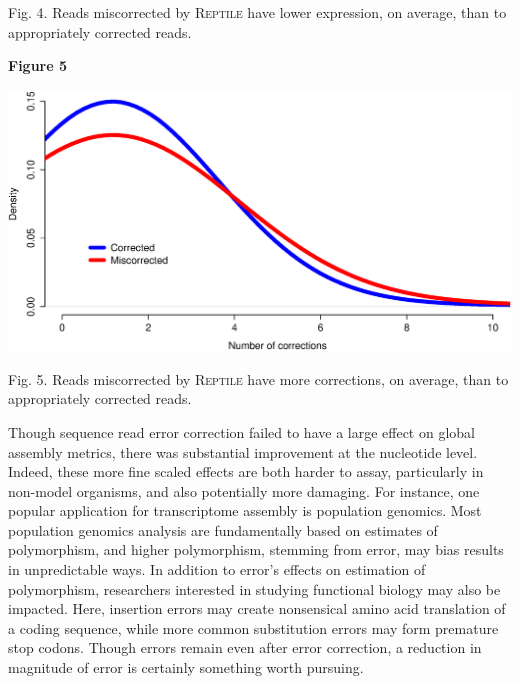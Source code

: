 \documentclass[11pt]{article}
\begin{document}
\noindent
\begin{changemargin}{2cm}{2cm}
Fig. 4. Reads miscorrected by \textsc{Reptile} have lower expression, on average, than to appropriately corrected reads.
\end{changemargin}
\vspace{10mm}



\textbf{\hypertarget{Figure 5}{Figure 5}} \\
\centerline{\includegraphics[width=20.0\baselineskip]{FigX.eps}}

\noindent
\begin{changemargin}{2cm}{2cm}
Fig. 5. Reads miscorrected by \textsc{Reptile} have more corrections, on average, than to appropriately corrected reads.
\end{changemargin}
\vspace{10mm}

\noindent
Though sequence read error correction failed to have a large effect on global assembly metrics, there was substantial improvement at the nucleotide level.  Indeed, these more fine scaled effects are both harder to assay, particularly in non-model organisms, and also potentially more damaging. For instance, one popular application for transcriptome assembly is population genomics.  Most population genomics analysis are fundamentally based on estimates of polymorphism, and higher polymorphism, stemming from error, may bias results in unpredictable ways. In addition to error's effects on estimation of polymorphism, researchers interested in studying functional biology may also be impacted. Here, insertion errors may create nonsensical amino acid translation of a coding sequence, while more common substitution errors may form premature stop codons.  Though errors remain even after error correction, a reduction in magnitude of error is certainly something worth pursuing. 
\end{document}
